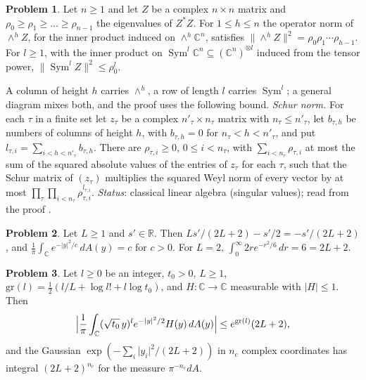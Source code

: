 \documentclass[reqno]{amsart}
\theoremstyle{definition}
\newtheorem{problem}{Problem}[section]
\theoremstyle{plain}
\theoremstyle{remark}
\newcommand{\R}{\mathbb{R}}
\newcommand{\C}{\mathbb{C}}
\newcommand{\Sym}{\operatorname{Sym}}
\begin{document}
\begin{problem}\label{pr:schur-model}
Let \(n \ge 1\) and let \(Z\) be a complex \(n \times n\) matrix and \(\rho_0 \ge \rho_1 \ge \dots \ge \rho_{n-1}\) the eigenvalues of \(Z^*Z\).  For \(1 \le h \le n\) the operator norm of \(\wedge^h Z\), for the inner product induced on \(\wedge^h\C^n\), satisfies \(\lVert\wedge^h Z\rVert^2 = \rho_0\rho_1\cdots\rho_{h-1}\).  For \(l \ge 1\), with the inner product on \(\Sym^l\C^n \subseteq (\C^n)^{\otimes l}\) induced from the tensor power, \(\lVert\Sym^l Z\rVert^2 \le \rho_0^l\).
\end{problem}

A column of height \(h\) carries \(\wedge^h\), a row of length \(l\) carries \(\Sym^l\); a general diagram mixes both, and the proof uses the following bound.  \emph{Schur norm.}  For each \(\tau\) in a finite set let \(z_\tau\) be a complex \(n'_\tau \times n_\tau\) matrix with \(n_\tau \le n'_\tau\), let \(b_{\tau,h}\) be numbers of columns of height \(h\), with \(b_{\tau,h} = 0\) for \(n_\tau < h < n'_\tau\), and put \(l_{\tau,i} = \sum_{i < h < n'_\tau} b_{\tau,h}\).  There are \(\rho_{\tau,i} \ge 0\), \(0 \le i < n_\tau\), with \(\sum_{i < n_\tau}\rho_{\tau,i}\) at most the sum of the squared absolute values of the entries of \(z_\tau\) for each \(\tau\), such that the Schur matrix of \((z_\tau)\) multiplies the squared Weyl norm of every vector by at most \(\prod_\tau\prod_{i < n_\tau}\rho_{\tau,i}^{l_{\tau,i}}\).  \emph{Status}: classical linear algebra (singular values); read from the proof \cite{GL}.

\begin{problem}\label{pr:gaussian}
Let \(L \ge 1\) and \(s' \in \R\).  Then \(Ls'/(2L + 2) - s'/2 = -s'/(2L + 2)\), and \(\frac1\pi\int_\C e^{-\lvert y\rvert^2/c}\,dA(y) = c\) for \(c > 0\).  For \(L = 2\), \(\int_0^\infty 2r e^{-r^2/6}\,dr = 6 = 2L + 2\).
\end{problem}

\begin{problem}\label{pr:integrated-row}
Let \(l \ge 0\) be an integer, \(t_0 > 0\), \(L \ge 1\), \(\mathrm{gr}(l) = \frac12(l/L + \log l! + l\log t_0)\), and \(H\colon \C \to \C\) measurable with \(\lvert H\rvert \le 1\).  Then
\[
  \Bigl\lvert\frac1\pi\int_\C(\sqrt{t_0}\,y)^l e^{-\lvert y\rvert^2/2}H(y)\,dA(y)\Bigr\rvert \le e^{\mathrm{gr}(l)}(2L + 2) ,
\]
and the Gaussian \(\exp(-\sum_i\lvert y_i\rvert^2/(2L + 2))\) in \(n_{\mathrm{c}}\) complex coordinates has integral \((2L + 2)^{n_{\mathrm{c}}}\) for the measure \(\pi^{-n_{\mathrm{c}}}dA\).
\end{problem}
\end{document}
